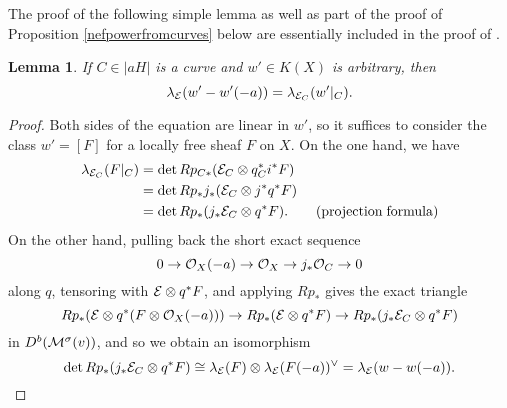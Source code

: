 \documentclass[letterpaper,11pt]{amsart}%
\newtheorem{lem}[thm]{Lemma}
\theoremstyle{remark}
\begin{document}
The proof of the following simple lemma as well as part of the proof of Proposition \ref{nefpowerfromcurves} below are essentially included in the proof of \cite[Proposition 8.2.3]{HL}.

\begin{lem}\label{Ktheorylemma}
    If $C \in |a H|$ is a curve and $w' \in K(X)$ is arbitrary, then
    \[ \lambda_{\mathcal{E}}(w' - w'(-a)) = \lambda_{\mathcal{E}_C}(w'|_C). \]
\end{lem}
\begin{proof}
    Both sides of the equation are linear in $w'$, so it suffices to consider the class $w' = [F]$ for a locally free sheaf $F$ on $X$. On the one hand, we have
    \begin{align*}
        \lambda_{\mathcal{E}_C}(F|_C) & = \det R p_{C*}(\mathcal{E}_C \otimes q_C^* i^* F) \\
        & = \det R p_* j_*(\mathcal{E}_C \otimes j^* q^* F) \\
        & = \det R p_* (j_*\mathcal{E}_C \otimes q^* F). \qquad \mathrm{(projection\;formula)}
    \end{align*}
    On the other hand, pulling back the short exact sequence 
    \[ 0 \to \mathcal{O}_X(-a) \to \mathcal{O}_X \to j_* \mathcal{O}_C \to 0 \]
    along $q$, tensoring with $\mathcal{E} \otimes q^* F$, and applying $R p_*$ gives the exact triangle
    \[ R p_* (\mathcal{E} \otimes q^*(F \otimes \mathcal{O}_X(-a))) \to R p_* (\mathcal{E} \otimes q^*F) \to R p_* (j_* \mathcal{E}_C \otimes q^*F) \]
    in $D^b(\mathcal{M}^\sigma(v))$, and so we obtain an isomorphism
    \[ \det R p_* (j_* \mathcal{E}_C \otimes q^*F) \cong \lambda_{\mathcal{E}}(F) \otimes \lambda_{\mathcal{E}}(F(-a))^\vee = \lambda_{\mathcal{E}}(w - w(-a)). \]
\end{proof}
\end{document}
